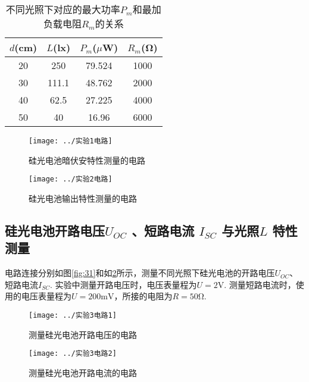 \documentclass[11pt]{article}
\begin{document}
\begin{table}[htbp]
	\centering
	\caption{不同光照下对应的最大功率$ P_m $和最加负载电阻$ R_m $的关系}
	\begin{tabular}{cccc}
		\toprule
		$ d $(cm) & $ L $(lx) & $ P_m $($ \mu $W) & $ R_m $(Ω) \\
		\midrule
		20    & 250   & 79.524   & 1000    \\
		30    & 111.1 & 48.762   & 2000    \\
		40    & 62.5  & 27.225   & 4000    \\
		50    & 40    & 16.96    & 6000    \\
		\bottomrule
	\end{tabular}
\end{table}
\begin{figure}[htbp]
	\centering
	\begin{minipage}{0.5\linewidth}
		\centering
		\texttt{[image: ../实验1电路]}
		\caption{硅光电池暗伏安特性测量的电路}
		\label{fig:4}
	\end{minipage}
	\begin{minipage}{0.4\linewidth}
		\centering
		\texttt{[image: ../实验2电路]}
		\caption{硅光电池输出特性测量的电路}
		\label{fig:5}
	\end{minipage}
\end{figure}

\subsection{硅光电池开路电压$ U_{OC} $ 、短路电流 $ I_{SC}  $ 与光照$  L $ 特性测量}
电路连接分别如图\ref{fig:31}和如\ref{fig:32}所示，测量不同光照下硅光电池的开路电压$ U_{OC}  $、短路电流$  I_{SC}  $. 实验中测量开路电压时，电压表量程为$ U=2\text{V} $. 测量短路电流时，使用的电压表量程为$ U=200\text{mV} $，所接的电阻为$ R=50 $Ω.
\begin{figure}[htbp]
	\centering
	\begin{minipage}{0.4\linewidth}
		\centering
		\texttt{[image: ../实验3电路1]}
		\caption{测量硅光电池开路电压的电路}
		\label{fig:31}
	\end{minipage}
	\begin{minipage}{0.4\linewidth}
		\centering
		\texttt{[image: ../实验3电路2]}
		\caption{测量硅光电池开路电流的电路}
		\label{fig:32}
	\end{minipage}
\end{figure}
\end{document}
